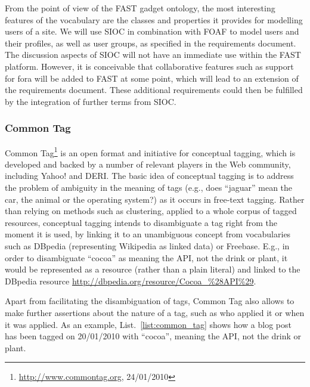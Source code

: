 \documentclass[twoside]{fast_latex}
\begin{document}
From the point of view of the FAST gadget ontology, the most interesting features of the vocabulary are the classes and properties it provides for modelling users of a site. We will use SIOC in combination with FOAF to model users and their profiles, as well as user groups, as specified in the requirements document. The discussion aspects of SIOC will not have an immediate use within the FAST platform. However, it is conceivable that collaborative features such as support for fora will be added to FAST at some point, which will lead to an extension of the requirements document. These additional requirements could then be fulfilled by the integration of further terms from SIOC.

\subsubsection{Common Tag} %
\label{ssub:common_tag}

Common Tag\footnote{\url{http://www.commontag.org}, 24/01/2010} is an open format and initiative for conceptual tagging, which is developed and backed by a number of relevant players in the Web community, including Yahoo! and DERI. The basic idea of conceptual tagging is to address the problem of ambiguity in the meaning of tags (e.g., does ``jaguar'' mean the car, the animal or the operating system?) as it occurs in free-text tagging. Rather than relying on methods such as clustering, applied to a whole corpus of tagged resources, conceptual tagging intends to disambiguate a tag right from the moment it is used, by linking it to an unambiguous concept from vocabularies such as DBpedia (representing Wikipedia as linked data) or Freebase. E.g., in order to disambiguate ``cocoa'' as meaning the API, not the drink or plant, it would be represented as a resource (rather than a plain literal) and linked to the DBpedia resource \url{http://dbpedia.org/resource/Cocoa_%28API%29}.

Apart from facilitating the disambiguation of tags, Common Tag also allows to make further assertions about the nature of a tag, such as who applied it or when it was applied. As an example, List.~\ref{list:common_tag} shows how a blog post has been tagged on 20/01/2010 with ``cocoa'', meaning the API, not the drink or plant.

\singlespacing
{}
\begin{figure}[ht]
	
\end{figure}
\doublespacing
\end{document}
